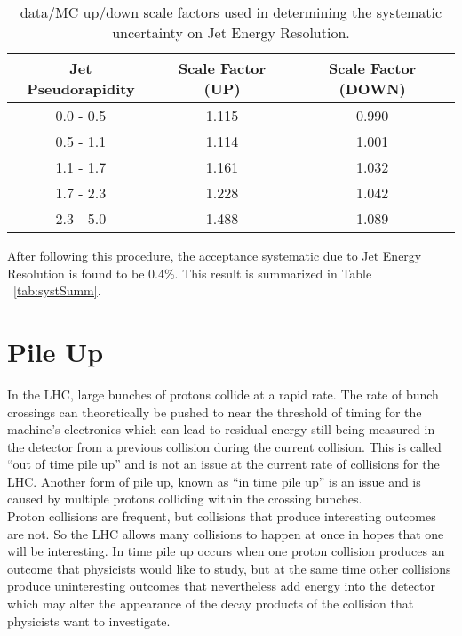 \begin{table}[h]
\begin{center}
\caption{\small \label{tab:jer_scalefactor_updown} data/MC up/down scale factors used in determining the systematic uncertainty on Jet Energy Resolution.}
\begin{tabular}{c|c|c}\hline
Jet Pseudorapidity & Scale Factor (UP) & Scale Factor (DOWN)\\ \hline \hline
0.0 - 0.5 & 1.115 & 0.990 \\
0.5 - 1.1 & 1.114 & 1.001 \\
1.1 - 1.7 & 1.161 & 1.032 \\
1.7 - 2.3 & 1.228 & 1.042 \\
2.3 - 5.0 & 1.488 & 1.089 \\
\hline
\hline
\end{tabular}
\end{center}
\end{table}

After following this procedure, the acceptance systematic due to Jet Energy Resolution is found to be 0.4\%. This result is summarized in Table ~\ref{tab:systSumm}.\\

\section{Pile Up}
In the LHC, large bunches of protons collide at a rapid rate. The rate of bunch crossings can theoretically be pushed to near the threshold of timing for the machine's electronics which can lead to residual energy still being measured in the detector from a previous collision during the current collision. This is called ``out of time pile up'' and is not an issue at the current rate of collisions for the LHC. Another form of pile up, known as ``in time pile up'' is an issue and is caused by multiple protons colliding within the crossing bunches.\\ 

Proton collisions are frequent, but collisions that produce interesting outcomes are not. So the LHC allows many collisions to happen at once in hopes that one will be interesting. In time pile up occurs when one proton collision produces an outcome that physicists would like to study, but at the same time other collisions produce uninteresting outcomes that nevertheless add energy into the detector which may alter the appearance of the decay products of the collision that physicists want to investigate.\\

